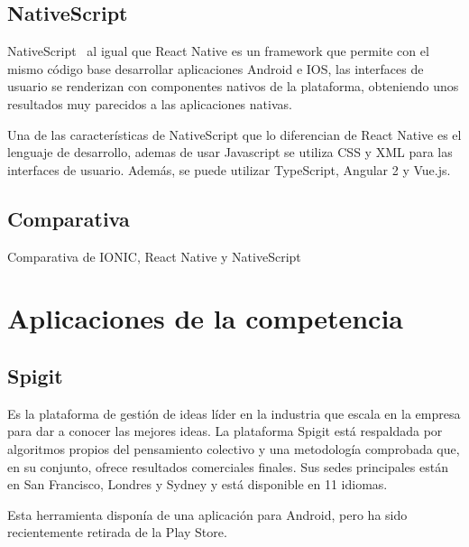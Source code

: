 \subsection{NativeScript}

NativeScript~\cite{NATSCR} al igual que React Native es un framework que permite con el mismo código base desarrollar aplicaciones 
Android e IOS, las interfaces de usuario se renderizan con componentes nativos de la plataforma, obteniendo unos 
resultados muy parecidos a las aplicaciones nativas.

Una de las características de NativeScript que lo diferencian de React Native es el lenguaje de desarrollo, ademas de 
usar Javascript se utiliza CSS y XML para las interfaces de usuario. Además, se puede utilizar TypeScript, Angular 2 y
Vue.js.

\subsection{Comparativa}

\begin{table}[comparativa]
	\centering
	{\small
		
	}
	\caption[Comparativa de IONIC, React Native, NativeScript]
	{Comparativa de IONIC, React Native y NativeScript~\cite{comparativaHibridas}}
	\label{tab:comparativa}
\end{table}

\section{Aplicaciones de la competencia}
\subsection{Spigit}

Es la plataforma de gestión de ideas líder en la industria que escala en la empresa para dar a conocer las mejores ideas. La plataforma Spigit está respaldada por algoritmos propios del pensamiento colectivo y una metodología comprobada que, en su conjunto, ofrece resultados comerciales finales. Sus sedes principales están en San Francisco, Londres y Sydney y está disponible en 11 idiomas.

Esta herramienta disponía de una aplicación para Android, pero ha sido recientemente retirada de la 
Play Store.

